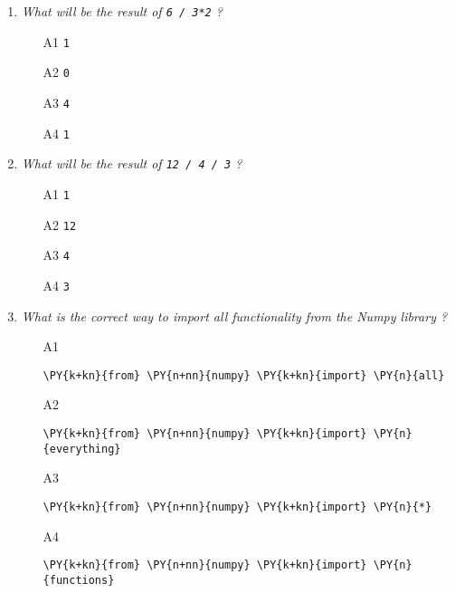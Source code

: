 \begin{enumerate}
\vspace{6mm}

\item {\em What will be the result of {\tt 6 / 3*2} ?}\\

\begin{enumerate}
\item[A1] {\tt 1}
\item[A2] {\tt 0}
\item[A3] {\tt 4}
\item[A4] {\tt 1}
\end{enumerate}

\vspace{6mm}

\item {\em What will be the result of {\tt 12 / 4 / 3} ?}\\

\begin{enumerate}
\item[A1] {\tt 1}
\item[A2] {\tt 12}
\item[A3] {\tt 4}
\item[A4] {\tt 3}
\end{enumerate}

\vspace{6mm}

\item {\em What is the correct way to import all functionality from the Numpy library ?}\\

\begin{enumerate}
\item[A1] 
\begin{Verbatim}[commandchars=\\\{\}]
\PY{k+kn}{from} \PY{n+nn}{numpy} \PY{k+kn}{import} \PY{n}{all}
\end{Verbatim}
\item[A2] 
\begin{Verbatim}[commandchars=\\\{\}]
\PY{k+kn}{from} \PY{n+nn}{numpy} \PY{k+kn}{import} \PY{n}{everything}
\end{Verbatim}
\item[A3]
\begin{Verbatim}[commandchars=\\\{\}]
\PY{k+kn}{from} \PY{n+nn}{numpy} \PY{k+kn}{import} \PY{n}{*}
\end{Verbatim}
\item[A4] 
\begin{Verbatim}[commandchars=\\\{\}]
\PY{k+kn}{from} \PY{n+nn}{numpy} \PY{k+kn}{import} \PY{n}{functions}
\end{Verbatim}
\end{enumerate}


\end{enumerate}
